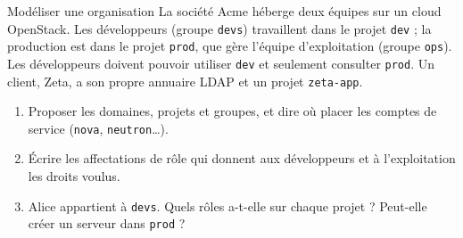 \begin{exercice}{Modéliser une organisation}\label{ex:ks-modele}
La société Acme héberge deux équipes sur un cloud OpenStack. Les développeurs (groupe \texttt{devs}) travaillent dans le projet
\texttt{dev} ; la production est dans le projet \texttt{prod}, que gère l'équipe d'exploitation (groupe \texttt{ops}). Les développeurs
doivent pouvoir utiliser \texttt{dev} et seulement consulter \texttt{prod}. Un client, Zeta, a son propre annuaire LDAP et un projet
\texttt{zeta-app}.
\begin{enumerate}[label=\arabic*.,nosep]
  \item Proposer les domaines, projets et groupes, et dire où placer les comptes de service (\texttt{nova}, \texttt{neutron}\dots).
  \item Écrire les affectations de rôle qui donnent aux développeurs et à l'exploitation les droits voulus.
  \item Alice appartient à \texttt{devs}. Quels rôles a-t-elle sur chaque projet ? Peut-elle créer un serveur dans \texttt{prod} ?
\end{enumerate}
\end{exercice}

